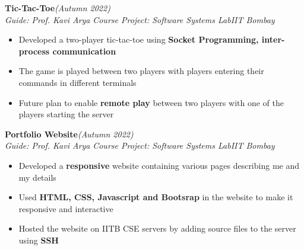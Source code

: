 \documentclass[12 pt]{article}
\begin{document}
	{\selectfont
		\textbf{{Tic-Tac-Toe}}\hfill{\sl \small (Autumn 2022)}\\
	}{\it Guide: Prof. Kavi Arya \textbar} {\it Course Project: Software Systems Lab}\hfill{\sl \small IIT Bombay}\\
	\begin{itemize}[itemsep = -0.8 mm, leftmargin=*]
		\vspace{-16pt}
		\item Developed a two-player tic-tac-toe using \textbf{Socket Programming, inter-process communication}
		\item The game is played between two players with players entering their commands in different terminals
		\item Future plan to enable \textbf{remote play} between two players with one of the players starting the server
	\end{itemize}
	{\selectfont
		\textbf{{Portfolio Website}}\hfill{\sl \small (Autumn 2022)}\\
	}{\it Guide: Prof. Kavi Arya \textbar} {\it Course Project: Software Systems Lab}\hfill{\sl \small IIT Bombay}\\
	\begin{itemize}[itemsep = -0.8 mm, leftmargin=*]
		\vspace{-16pt}
		\item Developed  a \textbf{responsive} website containing various pages describing me and my details
		\item Used \textbf{HTML, CSS, Javascript and Bootsrap} in the website to make it responsive and interactive
		\item Hosted the website on IITB CSE servers by adding source files to the server using \textbf{SSH}
	\end{itemize}
\vspace{-16pt}
\end{document}
